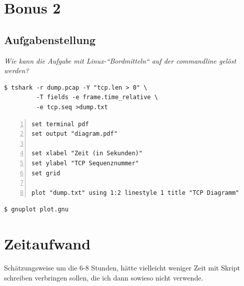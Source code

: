 \documentclass[
    pdftex,
    12pt,
    parskip=half,
    a4paper
]{scrartcl}
\begin{document}
\section{Bonus 2}
\subsection{Aufgabenstellung}
\textit{Wie kann die Aufgabe mit Linux-“Bordmitteln“ auf der commandline gelöst werden?}
\vspace{5cm}%

\begin{lstlisting}
$ tshark -r dump.pcap -Y "tcp.len > 0" \
         -T fields -e frame.time_relative \
         -e tcp.seq >dump.txt
\end{lstlisting}
\vspace{5cm}%

\begin{lstlisting}[language=gnuplot, numbers=left, numberstyle=\tiny, showspaces=false, showstringspaces=false]
set terminal pdf
set output "diagram.pdf"

set xlabel "Zeit (in Sekunden)"
set ylabel "TCP Sequenznummer"
set grid

plot "dump.txt" using 1:2 linestyle 1 title "TCP Diagramm"
\end{lstlisting}
\vspace{3cm}%

\begin{lstlisting}
$ gnuplot plot.gnu
\end{lstlisting}

\section{Zeitaufwand}
Schätzungsweise um die 6-8 Stunden, hätte vielleicht weniger Zeit mit Skript schreiben verbringen sollen, die
ich dann sowieso nicht verwende.
\end{document}
